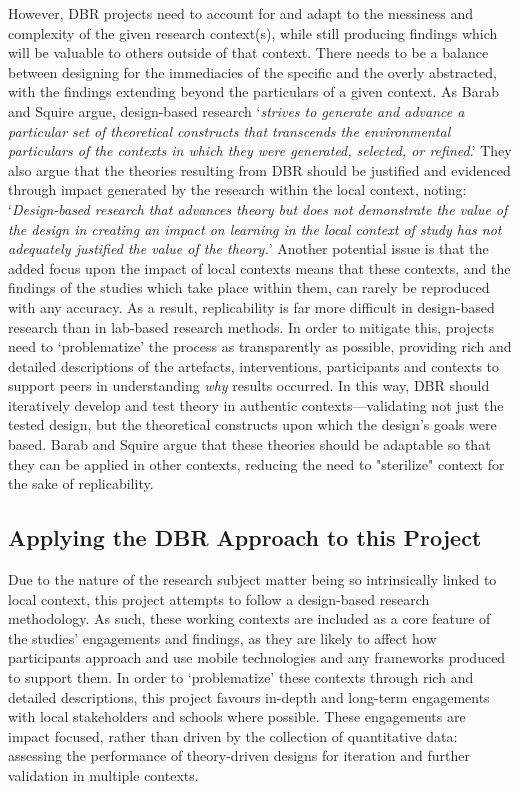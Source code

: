 However, DBR projects need to account for and adapt to the messiness and complexity of the given research context(s), while still producing findings which will be valuable to others outside of that context. There needs to be a balance between designing for the immediacies of the specific and the overly abstracted, with the findings extending beyond the particulars of a given context. As Barab and Squire argue, design-based research `\textit{strives to generate and advance a particular set of theoretical constructs that transcends the environmental particulars of the contexts in which they were generated, selected, or refined}.' They also argue that the theories resulting from DBR should be justified and evidenced through impact generated by the research within the local context, noting: `\textit{Design-based research that advances theory but does not demonstrate the value of the design in creating an impact on learning in the local context of study has not adequately justified the value of the theory.}' Another potential issue is that the added focus upon the impact of local contexts means that these contexts, and the findings of the studies which take place within them, can rarely be reproduced with any accuracy. As a result, replicability is far more difficult in design-based research than in lab-based research methods. In order to mitigate this, projects need to `problematize' the process as transparently as possible, providing rich and detailed descriptions of the artefacts, interventions, participants and contexts to support peers in understanding \textit{why} results occurred. In this way, DBR should iteratively develop and test theory in authentic contexts---validating not just the tested design, but the theoretical constructs upon which the design's goals were based. Barab and Squire argue that these theories should be adaptable so that they can be applied in other contexts, reducing the need to "sterilize" context for the sake of replicability.

\subsection{Applying the DBR Approach to this Project}

Due to the nature of the research subject matter being so intrinsically linked to local context, this project attempts to follow a design-based research methodology. As such, these working contexts are included as a core feature of the studies' engagements and findings, as they are likely to affect how participants approach and use mobile technologies and any frameworks produced to support them. In order to `problematize' these contexts through rich and detailed descriptions, this project favours in-depth and long-term engagements with local stakeholders and schools where possible. These engagements are impact focused, rather than driven by the collection of quantitative data: assessing the performance of theory-driven designs for iteration and further validation in multiple contexts.

